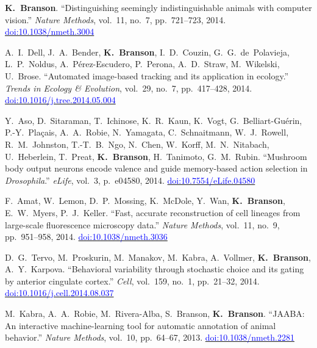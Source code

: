 \begin{cvenum}
\item {\bf K.~Branson}. ``Distinguishing seemingly indistinguishable animals with computer vision.'' {\em Nature Methods}, vol.~11, no.~7, pp.~721--723, 2014. \href{https://doi.org/10.1038/nmeth.3004}{\small\textcolor{blue}{doi:10.1038/nmeth.3004}}

\item A.~I.~Dell, J.~A.~Bender, {\bf K.~Branson}, I.~D.~Couzin, G.~G.~de~Polavieja, L.~P.~Noldus, A.~P{\'e}rez-Escudero, P.~Perona, A.~D.~Straw, M.~Wikelski, U.~Brose. ``Automated image-based tracking and its application in ecology.'' {\em Trends in Ecology \& Evolution}, vol.~29, no.~7, pp.~417--428, 2014. \href{https://doi.org/10.1016/j.tree.2014.05.004}{\small\textcolor{blue}{doi:10.1016/j.tree.2014.05.004}}

\item Y.~Aso, D.~Sitaraman, T.~Ichinose, K.~R.~Kaun, K.~Vogt, G.~Belliart-Gu{\'e}rin, P.-Y.~Pla{\c{c}}ais, A.~A.~Robie, N.~Yamagata, C.~Schnaitmann, W.~J.~Rowell, R.~M.~Johnston, T.-T.~B.~Ngo, N.~Chen, W.~Korff, M.~N.~Nitabach, U.~Heberlein, T.~Preat, {\bf K.~Branson}, H.~Tanimoto, G.~M.~Rubin. ``Mushroom body output neurons encode valence and guide memory-based action selection in {\em {D}rosophila}.'' {\em eLife}, vol.~3, p.~e04580, 2014. \href{https://doi.org/10.7554/eLife.04580}{\small\textcolor{blue}{doi:10.7554/eLife.04580}}

\item F.~Amat, W.~Lemon, D.~P.~Mossing, K.~McDole, Y.~Wan, {\bf K.~Branson}, E.~W.~Myers, P.~J.~Keller. ``Fast, accurate reconstruction of cell lineages from large-scale fluorescence microscopy data.'' {\em Nature Methods}, vol.~11, no.~9, pp.~951--958, 2014. \href{https://doi.org/10.1038/nmeth.3036}{\small\textcolor{blue}{doi:10.1038/nmeth.3036}}

\item D.~G.~Tervo, M.~Proskurin, M.~Manakov, M.~Kabra, A.~Vollmer, {\bf K.~Branson}, A.~Y.~Karpova. ``Behavioral variability through stochastic choice and its gating by anterior cingulate cortex.'' {\em Cell}, vol.~159, no.~1, pp.~21--32, 2014. \href{https://doi.org/10.1016/j.cell.2014.08.037}{\small\textcolor{blue}{doi:10.1016/j.cell.2014.08.037}}
  
\item M.~Kabra, A.~A.~Robie, M.~Rivera-Alba, S.~Branson, {\bf K.~Branson}. ``{JAABA}: An interactive machine-learning tool for automatic annotation of animal behavior.'' {\em Nature Methods}, vol.~10, pp.~64--67, 2013. \href{https://doi.org/10.1038/nmeth.2281}{\small\textcolor{blue}{doi:10.1038/nmeth.2281}}


\end{cvenum}
